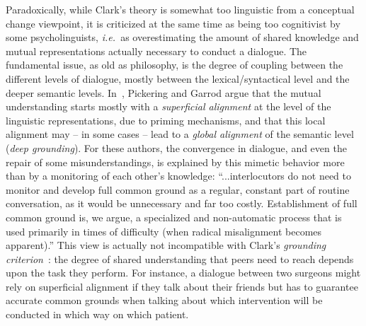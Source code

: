 \documentclass{sig-alternate}
\newcommand{\ie}{{\textit{i.e.~}}}
\begin{document}
Paradoxically, while Clark's theory is somewhat too linguistic from a conceptual
change viewpoint, it is criticized at the same time as being too cognitivist by
some psycholinguists, \ie as overestimating the amount of shared knowledge and
mutual representations actually necessary to conduct a dialogue. The fundamental
issue, as old as philosophy, is the degree of coupling between the different
levels of dialogue, mostly between the lexical/syntactical level and the deeper
semantic levels. In~\cite{pickering2006alignment}, Pickering and Garrod argue
that the mutual understanding starts mostly with a \emph{superficial alignment}
at the level of the linguistic representations, due to priming mechanisms, and
that this local alignment may -- in some cases -- lead to a \emph{global
alignment} of the semantic level (\emph{deep grounding}).  For these authors,
the convergence in dialogue, and even the repair of some misunderstandings, is
explained by this mimetic behavior more than by a monitoring of each other's
knowledge: ``...interlocutors do not need to monitor and develop full common
ground as a regular, constant part of routine conversation, as it would be
unnecessary and far too costly. Establishment of full common ground is, we
argue, a specialized and non-automatic process that is used primarily in times
of difficulty (when radical misalignment becomes apparent).'' This view is
actually not incompatible with Clark's \emph{grounding
criterion}~\cite{clark1989contributing}: the degree of shared understanding that
peers need to reach depends upon the task they perform. For instance, a dialogue
between two surgeons might rely on superficial alignment if they talk about
their friends but has to guarantee accurate common grounds when talking about
which intervention will be conducted in which way on which patient.

\end{document}
